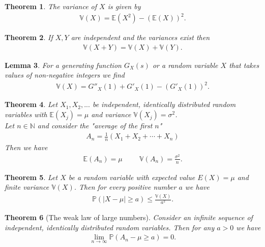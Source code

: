 \documentclass{article}
\theoremstyle{sltheorem}
\newtheorem{theorem}{Theorem}[section]
\newtheorem{lemma}[theorem]{Lemma}
\newcommand{\N}{\mathbb{N}}
\renewcommand{\P}{\mathbb{P}}
\newcommand{\E}{\mathbb{E}}
\newcommand{\V}{\mathbb{V}}
\begin{document}
\begin{theorem}
    The variance of $X$ is given by
    \begin{align*}
        \V(X) = \E(X^2) - \left(\E(X)\right)^2.
    \end{align*}
\end{theorem}
\begin{theorem}
    If $X,Y$ are independent and the variances exist then
    \begin{align*}
        \V(X+Y) = \V(X) + \V(Y).
    \end{align*}
\end{theorem}
\begin{lemma}
    For a generating function $G_X(s)$ or a random variable
    $X$ that takes values of non-negative integers
    we find
    \begin{align*}
        \V(X) = G''_X(1) + G'_X(1) - \left(G'_X(1)\right)^2.
    \end{align*}
\end{lemma}
\begin{theorem}
    Let $X_1, X_2, ...$ be independent, identically
    distributed random variables with $\E(X_j)=\mu$
    and variance $\V(X_j)=\sigma^2$.\\
    Let $n\in\N$ and consider the "average of the first $n$"
    \begin{align*}
        A_n = \frac{1}{n}\left(X_1 + X_2 + \cdots + X_n\right)
    \end{align*}
    Then we have
    \begin{align*}
        \E(A_n) = \mu\hspace{1cm} \V(A_n) = \frac{\sigma^2}{n}.
    \end{align*}
\end{theorem}
\begin{theorem}
    Let $X$ be a random variable with expected value $E(X)=\mu$
    and finite variance $\V(X)$. Then for every positive number
    $a$ we have
    \begin{align*}
        \P(|X-\mu|\geq a) \leq \frac{\V(X)}{a^2}.
    \end{align*}
\end{theorem}
\begin{theorem}[The weak law of large numbers]
    Consider an infinite sequence of independent, identically
    distributed random variables. Then for any $a>0$ we have
    \begin{align*}
        \lim_{n\to\infty}\P(A_n - \mu \geq a) = 0.
    \end{align*}
\end{theorem}
\end{document}
